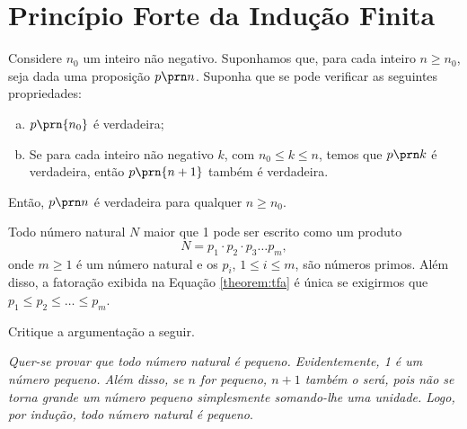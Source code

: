 \section{Princípio Forte da Indução Finita}

\begin{theorem}
Considere $n_0$ um inteiro não negativo. Suponhamos que, para cada inteiro $n \ge n_0$, seja dada uma proposição $p \prn n$. Suponha que se pode verificar as seguintes propriedades:
%
\begin{enumerate}[(a)]
  \item $p \prn{n_0}$ é verdadeira;
  \item Se para cada inteiro não negativo $k$, com $n_0 \le k \le n$, temos que
   $p \prn k$ é verdadeira, então $p \prn {n+1}$ também
  é verdadeira.
\end{enumerate}
%
Então, $p \prn n$ é verdadeira para qualquer $n \ge n_0$.
\end{theorem}

\begin{theorem}
Todo número natural $N$ maior que 1 pode ser escrito como um produto
%
\begin{equation}
\label{theorem:tfa}
N = p_1 \cdot p_2 \cdot p_3 \dots p_m,
\end{equation}
%
onde $m \ge 1$ é um número natural e os $p_i$, $1 \le i \le m$, são números primos. Além disso, a fatoração exibida na Equação \ref{theorem:tfa} é única se exigirmos que $p_1 \le p_2 \le \dots \le p_m$.
\end{theorem}

\begin{example}
Critique a argumentação a seguir.

\textit{Quer-se provar que todo número natural é pequeno. Evidentemente, 1 é um número pequeno. Além disso, se $n$ for pequeno, $n+1$ também o será, pois não se torna grande um número pequeno simplesmente somando-lhe uma unidade. Logo, por indução, todo número natural é pequeno}.
\end{example}

